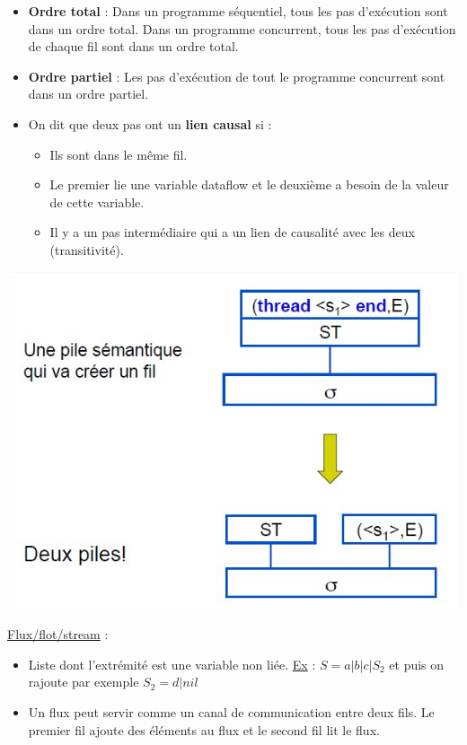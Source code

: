 \documentclass[fr,license=none,skiptoc]{../../../eplsummary}
\begin{document}
\begin{flushleft}
\begin{itemize}
\item \textbf{Ordre total} : Dans un programme séquentiel, tous les pas d'exécution sont dans un ordre total. Dans un programme concurrent, tous les pas d'exécution de chaque fil sont dans un ordre total.
\item \textbf{Ordre partiel} : Les pas d'exécution de tout le programme concurrent sont dans un ordre partiel.
\item On dit que deux pas ont un \textbf{lien causal} si :
\begin{itemize}[label=\textbullet]
\item Ils sont dans le même fil.
\item Le premier lie une variable dataflow et le deuxième a besoin de la valeur de cette variable.
\item Il y a un pas intermédiaire qui a un lien de causalité avec les deux (transitivité).
\end{itemize}
\end{itemize}
\begin{center}
\includegraphics[scale=0.35]{PileS.jpg}
\end{center}
\bigbreak



\textcolor{mauvedef}{\underline{Flux/flot/stream}} : 
\begin{itemize}
\item Liste dont l'extrémité est une variable non liée. \underline{Ex} : $S=a|b|c|S_2$ et puis on rajoute par exemple $S_2=d|nil$
\item Un flux peut servir comme un canal de communication entre deux fils. Le premier fil ajoute des éléments au flux et le second fil lit le flux.
\end{itemize} \bigbreak






\end{flushleft}
\end{document}
